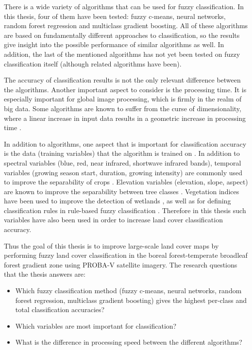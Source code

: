 \documentclass[a4paper,10pt]{book}
\begin{document}
There is a wide variety of algorithms that can be used for fuzzy classification. In this thesis, four of them have been tested: fuzzy c-means, neural networks, random forest regression and multiclass gradient boosting. All of these algorithms are based on fundamentally different approaches to classification, so the results give insight into the possible performance of similar algorithms as well. In addition, the last of the mentioned algorithms has not yet been tested on fuzzy classification itself (although related algorithms have been).

The accuracy of classification results is not the only relevant difference between the algorithms. Another important aspect to consider is the processing time. It is especially important for global image processing, which is firmly in the realm of big data. Some algorithms are known to suffer from the curse of dimensionality, where a linear increase in input data results in a geometric increase in processing time \citep{walton2008subpixelrf}.

In addition to algorithms, one aspect that is important for classification accuracy is the data (training variables) that the algorithm is trained on \citep{yu2014metadiscoveries}. In addition to spectral variables (blue, red, near infrared, shortwave infrared bands), temporal variables (growing season start, duration, growing intensity) are commonly used to improve the separability of crops \citep{jakubauskas2001harmonic}. Elevation variables (elevation, slope, aspect) are known to improve the separability between tree classes \citep{burrough2001fuzzy}. Vegetation indices have been used to improve the detection of wetlands \citep{sader1995wetlands}, as well as for defining classification rules in rule-based fuzzy classification \citep{baraldi2006rulebased}. Therefore in this thesis such variables have also been used in order to increase land cover classification accuracy.

Thus the goal of this thesis is to improve large-scale land cover maps by performing fuzzy land cover classification in the boreal forest-temperate broadleaf forest gradient zone using PROBA-V satellite imagery. The research questions that the thesis answers are:

\begin{itemize}
 \item Which fuzzy classification method (fuzzy c-means, neural networks, random forest regression, multiclass gradient boosting) gives the highest per-class and total classification accuracies?
 \item Which variables are most important for classification?
 \item What is the difference in processing speed between the different algorithms?
\end{itemize}
\end{document}
